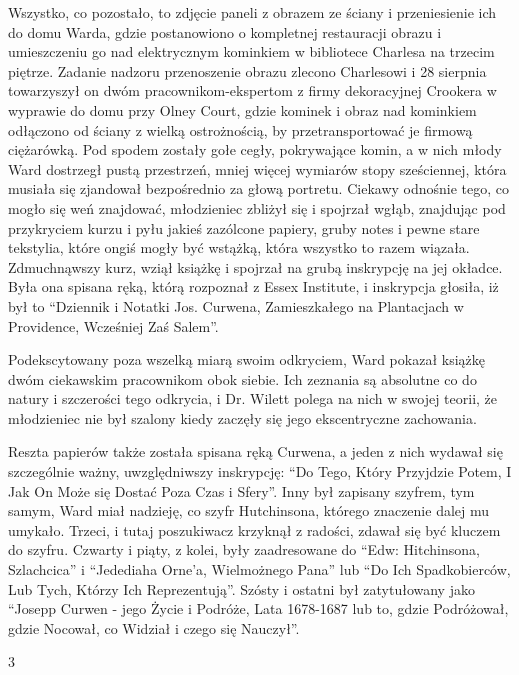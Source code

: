 Wszystko, co pozostało, to zdjęcie paneli z obrazem ze ściany i przeniesienie ich do domu Warda, gdzie postanowiono o kompletnej restauracji obrazu i umieszczeniu go nad elektrycznym kominkiem w bibliotece Charlesa na trzecim piętrze. Zadanie nadzoru przenoszenie obrazu zlecono Charlesowi i 28 sierpnia towarzyszył on dwóm pracownikom-ekspertom z firmy dekoracyjnej Crookera w wyprawie do domu przy Olney Court, gdzie kominek i obraz nad kominkiem odłączono od ściany z wielką ostrożnością, by przetransportować je firmową ciężarówką. Pod spodem zostały gołe cegły, pokrywające komin, a w nich młody Ward  dostrzegł pustą przestrzeń, mniej więcej wymiarów stopy sześciennej, która musiała się zjandował bezpośrednio za głową portretu. Ciekawy odnośnie tego, co mogło się weń znajdować, młodzieniec zbliżył się i spojrzał wgłąb, znajdując pod przykryciem kurzu i pyłu jakieś zazólcone papiery, gruby notes i pewne stare tekstylia, które ongiś mogły być wstążką, która wszystko to razem wiązała. Zdmuchnąwszy kurz, wziął książkę i spojrzał na grubą inskrypcję na jej okładce. Była ona spisana ręką, którą rozpoznał z Essex Institute, i inskrypcja głosiła, iż był to ``Dziennik i Notatki Jos. Curwena, Zamieszkałego na Plantacjach w Providence, Wcześniej Zaś Salem''.

Podekscytowany poza wszelką miarą swoim odkryciem, Ward pokazał książkę dwóm ciekawskim pracownikom obok siebie. Ich zeznania są absolutne co do natury i szczerości tego odkrycia, i Dr. Wilett polega na nich w swojej teorii, że młodzieniec nie był szalony kiedy zaczęły się jego ekscentryczne zachowania. 

Reszta papierów także została spisana ręką Curwena, a jeden z nich wydawał się szczególnie ważny, uwzględniwszy inskrypcję: ``Do Tego, Który Przyjdzie Potem, I Jak On Może się Dostać Poza Czas i Sfery''. Inny był zapisany szyfrem, tym samym, Ward miał nadzieję, co szyfr Hutchinsona, którego znaczenie dalej mu umykało. Trzeci, i tutaj poszukiwacz krzyknął z radości, zdawał się być kluczem do szyfru. Czwarty i piąty, z kolei, były zaadresowane do ``Edw: Hitchinsona, Szlachcica'' i ``Jedediaha Orne'a, Wielmożnego Pana'' lub ``Do Ich Spadkobierców, Lub Tych, Którzy Ich Reprezentują''. Szósty i ostatni był zatytułowany jako ``Josepp Curwen - jego Życie i Podróże, Lata 1678-1687 lub to, gdzie Podróżował, gdzie Nocował, co Widział i czego się Nauczył''. 

\begin{center}
3
\end{center}

